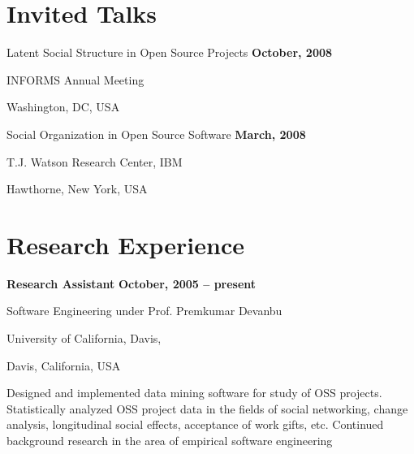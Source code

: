 \documentclass[margin,line,article]{res}
\newenvironment{list1}{
  \begin{list}{}{%
      \setlength{\itemsep}{0in}
      \setlength{\parsep}{0in} \setlength{\parskip}{0in}
      \setlength{\topsep}{0in} \setlength{\partopsep}{0in} 
      \setlength{\leftmargin}{0.17in}}}{\end{list}}
\begin{document}
\begin{resume}




\section{Invited Talks}
Latent Social Structure in Open Source Projects \hfill \textbf{October, 2008}\\
\vspace{-10pt}
\begin{list1}
\item INFORMS Annual Meeting
\item Washington, DC, USA
\end{list1}

Social Organization in Open Source Software \hfill \textbf{March, 2008}\\
\vspace{-10pt}
\begin{list1}
\item T.J. Watson Research Center, IBM
\item Hawthorne, New York, USA
\end{list1}

\section{Research Experience}
\textbf{Research Assistant} \hfill \textbf{October, 2005 -- present}\\
\vspace{-10pt}
\begin{list1}
\item Software Engineering under Prof. Premkumar Devanbu
\item University of California, Davis,
\item Davis, California, USA
\vspace{6pt}
\item Designed and implemented data mining software for study of OSS projects. Statistically 
analyzed OSS project data in the fields of social networking, change analysis, 
longitudinal social effects, acceptance of work gifts, etc. Continued background research in the 
area of empirical software engineering 
\end{list1}


\end{resume}
\end{document}
